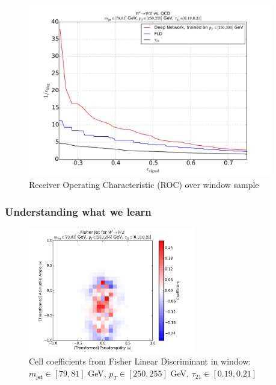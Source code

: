 \begin{figure}[htbp]
  \centering
  \includegraphics[width=0.95\textwidth]{figures/augwindow-roc.pdf}
  \caption{Receiver Operating Characteristic (ROC) over window sample}
  \label{fig:rocWindow}
\end{figure}

\subsubsection{Understanding what we learn} %
\label{ssub:understanding_what_we_learn}

\begin{figure}[htbp]
  \centering
  \includegraphics[width=0.65\textwidth]{figures/fld-benwindow.pdf}
  \caption{Cell coefficients from Fisher Linear Discriminant in window: $m_{\mathsf{jet}}\in [79, 81]$ GeV, $p_{T}\in [250, 255]$ GeV, $\tau_{21}\in[0.19, 0.21]$}
  \label{fig:fldWindow}
\end{figure}

